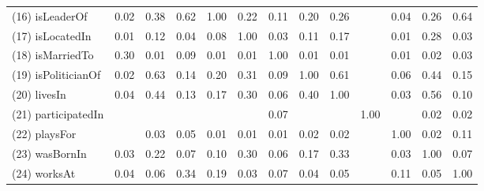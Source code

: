 \begin{table}[t]
\begin{center}
\begin{tabular}{|l||*{12}{c}|}
            (16) isLeaderOf  & 0.02  & 0.38  & 0.62  & 1.00  & 0.22  & 0.11  & 0.20  & 0.26  &    & 0.04  & 0.26  & 0.64 \\
            (17) isLocatedIn  & 0.01  & 0.12  & 0.04  & 0.08  & 1.00  & 0.03  & 0.11  & 0.17  &    & 0.01  & 0.28  & 0.03 \\
            (18) isMarriedTo  & 0.30  & 0.01  & 0.09  & 0.01  & 0.01  & 1.00  & 0.01  & 0.01  &    & 0.01  & 0.02  & 0.03 \\
            (19) isPoliticianOf  & 0.02  & 0.63  & 0.14  & 0.20  & 0.31  & 0.09  & 1.00  & 0.61  &    & 0.06  & 0.44  & 0.15 \\
            (20) livesIn  & 0.04  & 0.44  & 0.13  & 0.17  & 0.30  & 0.06  & 0.40  & 1.00  &    & 0.03  & 0.56  & 0.10 \\
            (21) participatedIn  &    &    &    &    &    & 0.07  &    &    & 1.00  &    & 0.02  & 0.02 \\
            (22) playsFor  &    & 0.03  & 0.05  & 0.01  & 0.01  & 0.01  & 0.02  & 0.02  &    & 1.00  & 0.02  & 0.11 \\
            (23) wasBornIn  & 0.03  & 0.22  & 0.07  & 0.10  & 0.30  & 0.06  & 0.17  & 0.33  &    & 0.03  & 1.00  & 0.07 \\
            (24) worksAt  & 0.04  & 0.06  & 0.34  & 0.19  & 0.03  & 0.07  & 0.04  & 0.05  &    & 0.11  & 0.05  & 1.00 \\
            \hline
        \end{tabular}
    \end{center}
\end{table}
